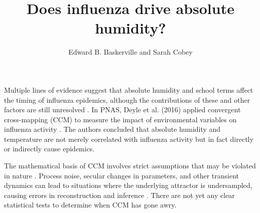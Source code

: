 \documentclass[11pt]{article}
\title{Does influenza drive absolute humidity?}
\author{Edward B. Baskerville and Sarah Cobey}
\affil{Department of Ecology and Evolution, University of Chicago}
\begin{document}
\maketitle

Multiple lines of evidence suggest that absolute humidity and school terms affect the timing of influenza epidemics, although the contributions of these and other factors are still unresolved \cite{Bjornstad2016,Shaman2010a,Shaman2010b,Chao2010,Tamerius2015}.
In PNAS, Deyle et al. (2016) applied convergent cross-mapping (CCM) to measure the impact of environmental variables on influenza activity \cite{Deyle2016}. 
The authors concluded that absolute humidity and temperature are not merely correlated with influenza activity but in fact directly or indirectly cause epidemics.

The mathematical basis of CCM involves strict assumptions that may be violated in nature \cite{Sugihara2012}.
Process noise, secular changes in parameters, and other transient dynamics can lead to situations where the underlying attractor is undersampled, causing errors in reconstruction and inference \cite{Cobey2016}.
There are not yet any clear statistical tests to determine when CCM has gone awry.
 
\end{document}
